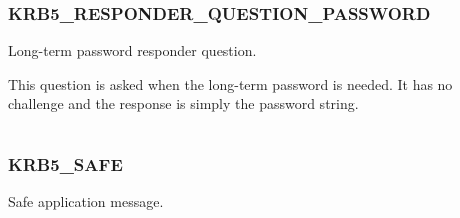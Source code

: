 \documentclass[letterpaper,10pt,english]{sphinxmanual}
\begin{document}
\subsubsection{KRB5\_RESPONDER\_QUESTION\_PASSWORD}
\label{appdev/refs/macros/KRB5_RESPONDER_QUESTION_PASSWORD:krb5-responder-question-password-data}\label{appdev/refs/macros/KRB5_RESPONDER_QUESTION_PASSWORD:krb5-responder-question-password}\label{appdev/refs/macros/KRB5_RESPONDER_QUESTION_PASSWORD::doc}

\begin{fulllineitems}
\label{appdev/refs/macros/KRB5_RESPONDER_QUESTION_PASSWORD:KRB5_RESPONDER_QUESTION_PASSWORD}
\end{fulllineitems}


Long-term password responder question.

This question is asked when the long-term password is needed. It has no challenge and the response is simply the password string.

\begin{tabulary}{\linewidth}{|L|L|}
\hline

 & 
\\\hline
\end{tabulary}



\subsubsection{KRB5\_SAFE}
\label{appdev/refs/macros/KRB5_SAFE:krb5-safe}\label{appdev/refs/macros/KRB5_SAFE::doc}\label{appdev/refs/macros/KRB5_SAFE:krb5-safe-data}

\begin{fulllineitems}
\label{appdev/refs/macros/KRB5_SAFE:KRB5_SAFE}
\end{fulllineitems}


Safe application message.

\begin{tabulary}{\linewidth}{|L|L|}
\hline

 & 
\\\hline
\end{tabulary}
\end{document}
